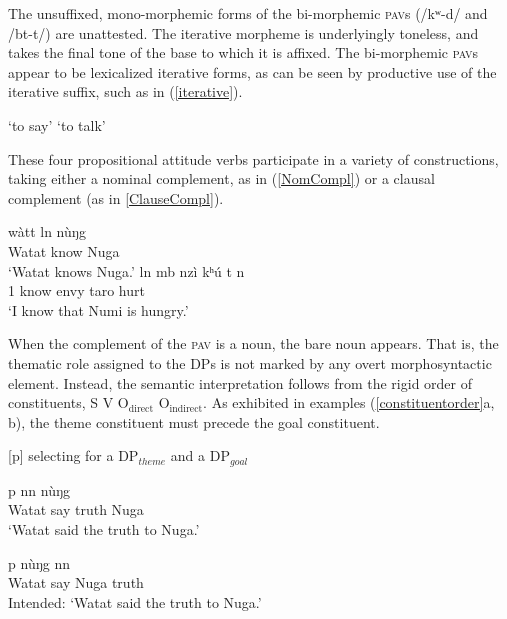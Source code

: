 \documentclass[output=paper,colorlinks,citecolor=brown]{langscibook}
\begin{document}
The unsuffixed, mono-morphemic forms of the bi-morphemic \textsc{pav}s (/kʷ\epL-d\schwaL/ and /b\epH t-t\schwaH/) are unattested. The iterative morpheme is underlyingly toneless, and takes the final tone of the base to which it is affixed. The bi-morphemic \textsc{pav}s appear to be lexicalized iterative forms, as can be seen by productive use of the iterative suffix, such as in (\ref{iterative}).

\ea \label{iterative}
    \begin{xlist}
       \tab `to say'
      \tab `to talk'
    \end{xlist}
\z

These four propositional attitude verbs participate in a variety of constructions, taking either a nominal complement, as in (\ref{NomCompl}) or a clausal complement (as in \ref{ClauseCompl}).

\ea
    \begin{xlist}
    \ex \label{NomCompl}
        \gll    w{à}t\epL\epH t l\epL\epH n n{ù}{ŋ}g\epL \\
                Watat           know        Nuga    \\
        \glt    `Watat knows Nuga.'
    \ex \label{ClauseCompl}
         l\epH n     {mb\baruL}    nzì kʰ{ú} \epL\epH t n\dz\epH        \\
                1  know      envy taro  hurt  \\
        \glt    `I know that Numi is hungry.'
    \end{xlist}
\z

When the complement of the \textsc{pav} is a noun, the bare noun appears. That is, the thematic role assigned to the DPs is not marked by any overt morphosyntactic element. Instead, the semantic interpretation follows from the rigid order of constituents, S V O$_{\text{direct}}$ O$_{\text{indirect}}$. As exhibited in examples (\ref{constituentorder}a, b), the theme constituent must precede the goal constituent.

\ea \label{constituentorder}
{[p]} selecting for a DP$_{theme}$ and a DP$_{goal}$ \\
    \begin{xlist}
    \ex
         {p} {n\baruH\ds n\baruH} {n{ù}{ŋ}g\epL}\\
             Watat say truth Nuga \\
        \glt `Watat said the truth to Nuga.'

    \ex
         {p} {n{ù}{ŋ}g\epL} {n\baruH\ds n\baruH} \\
             Watat say Nuga truth \\
        \glt Intended: `Watat said the truth to Nuga.'
    \end{xlist}
\z
\end{document}

